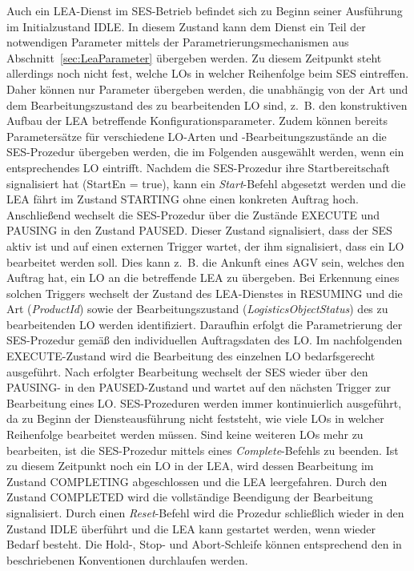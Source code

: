 Auch ein LEA-Dienst im SES-Betrieb befindet sich zu Beginn seiner Ausführung im Initialzustand IDLE. In diesem Zustand kann dem Dienst ein Teil der notwendigen Parameter mittels der Parametrierungsmechanismen aus Abschnitt~\ref{sec:LeaParameter} übergeben werden. Zu diesem Zeitpunkt steht allerdings noch nicht fest, welche LOs in welcher Reihenfolge beim SES eintreffen. Daher können nur Parameter übergeben werden, die unabhängig von der Art und dem Bearbeitungszustand des zu bearbeitenden LO sind, z.~B. den konstruktiven Aufbau der LEA betreffende Konfigurationsparameter. Zudem können bereits Parametersätze für verschiedene LO-Arten und -Bearbeitungszustände an die SES-Prozedur übergeben werden, die im Folgenden ausgewählt werden, wenn ein entsprechendes LO eintrifft. Nachdem die SES-Prozedur ihre Startbereitschaft signalisiert hat (StartEn = true), kann ein \emph{Start}-Befehl abgesetzt werden und die LEA fährt im Zustand STARTING ohne einen konkreten Auftrag hoch. Anschließend wechselt die SES-Prozedur über die Zustände EXECUTE und PAUSING in den Zustand PAUSED. Dieser Zustand signalisiert, dass der SES aktiv ist und auf einen externen Trigger wartet, der ihm signalisiert, dass ein LO bearbeitet werden soll. Dies kann z.~B. die Ankunft eines AGV sein, welches den Auftrag hat, ein LO an die betreffende LEA zu übergeben. Bei Erkennung eines solchen Triggers wechselt der Zustand des LEA-Dienstes in RESUMING und die Art (\emph{ProductId}) sowie der Bearbeitungszustand (\emph{LogisticsObjectStatus}) des zu bearbeitenden LO werden identifiziert. Daraufhin erfolgt die Parametrierung der SES-Prozedur gemäß den individuellen Auftragsdaten des LO. Im nachfolgenden EXECUTE-Zustand wird die Bearbeitung des einzelnen LO bedarfsgerecht ausgeführt. Nach erfolgter Bearbeitung wechselt der SES wieder über den PAUSING- in den PAUSED-Zustand und wartet auf den nächsten Trigger zur Bearbeitung eines LO. SES-Prozeduren werden immer kontinuierlich ausgeführt, da zu Beginn der Diensteausführung nicht feststeht, wie viele LOs in welcher Reihenfolge bearbeitet werden müssen. Sind keine weiteren LOs mehr zu bearbeiten, ist die SES-Prozedur mittels eines \emph{Complete}-Befehls zu beenden. Ist zu diesem Zeitpunkt noch ein LO in der LEA, wird dessen Bearbeitung im Zustand COMPLETING abgeschlossen und die LEA leergefahren. Durch den Zustand COMPLETED wird die vollständige Beendigung der Bearbeitung signalisiert. Durch einen \emph{Reset}-Befehl wird die Prozedur schließlich wieder in den Zustand IDLE überführt und die LEA kann gestartet werden, wenn wieder Bedarf besteht. Die Hold-, Stop- und Abort-Schleife können entsprechend den in \cite{PNO.2025.Part4} beschriebenen Konventionen durchlaufen werden. 

